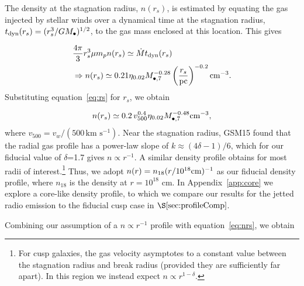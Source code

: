 \documentclass[usenatbib,fleqn]{mnras}
\newcommand{\Mbh}[1][]{M_{\bullet#1}}
\newcommand{\rs}{r_s}
\begin{document}
The density at the stagnation radius, $n(\rs)$, is estimated by
equating the gas injected by stellar winds over a dynamical time at
the stagnation radius, $t_{\rm dyn} (\rs)=(\rs^3/G \Mbh)^{1/2}$, to
the gas mass enclosed at this location.  This gives

\begin{align}
  &\frac{4 \pi}{3} \rs^3 \mu m_p n(r_s) \simeq \dot{M} t_{\rm dyn}
  (\rs) \nonumber\\
  &\Rightarrow n(r_s) \simeq 0.21 \eta_{0.02} \Mbh[,7]^{-0.28} \left(\frac{r_s}{\rm
      pc}\right)^{-0.2} {\rm cm}^{-3}.
\label{eq:nrs}
\end{align}
%
Substituting equation~\eqref{eq:rs} for $r_s$, we obtain 

\begin{equation}
n(r_s) \simeq 0.2 \, v_{500}^{0.4} \eta_{0.02} \Mbh[,7]^{-0.48} {\rm cm}^{-3},
\label{eq:nrs2}
\end{equation}
where $v_{500}=v_w/\left(500 \,\mathrm{km\,\,
    s^{-1}}\right)$. 
%
Near the stagnation radius, GSM15 found that the radial gas profile
has a power-law slope of $k \approx (4\delta-1)/6$, which for our
fiducial value of $\delta$=1.7 gives $n \propto r^{-1}$.  A similar
density profile obtains for most radii of interest.\footnote{For cusp
  galaxies, the gas velocity asymptotes to a constant value between
  the stagnation radius and break radius (provided they are
  sufficiently far apart). In this region we instead expect $n\propto
  r^{1-\delta}$.}  Thus, we adopt $n(r)= n_{18} (r/10^{18} {\rm
  cm})^{-1}$ as our fiducial density profile, where $n_{18}$ is the
density at $r = 10^{18}$ cm.  In Appendix~\ref{app:core} we explore a
core-like density profile, to which we compare our results for the
jetted radio emission to the fiducial cusp case in
$\S\ref{sec:profileComp}$.

Combining our assumption of a $n\propto r^{-1}$ profile with
equation~\eqref{eq:nrs}, we obtain
\end{document}
